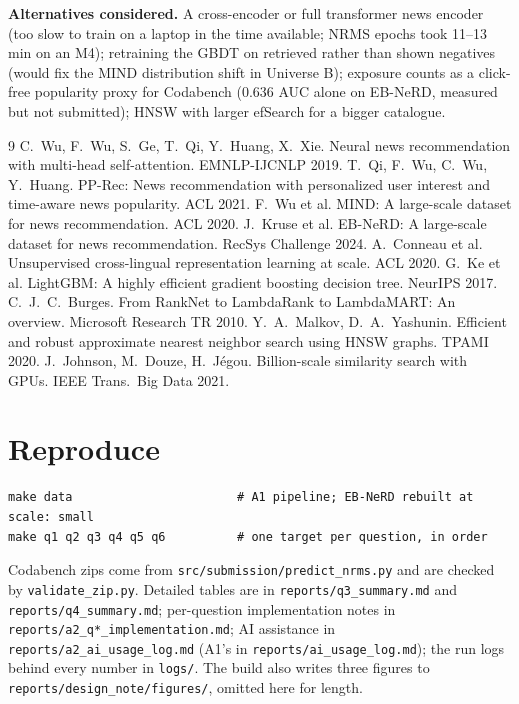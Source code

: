 \documentclass[10pt]{article}
\begin{document}
\textbf{Alternatives considered.} A cross-encoder or full transformer news encoder (too slow to train on a laptop in the
time available; NRMS epochs took 11--13 min on an M4); retraining the GBDT on retrieved rather than shown negatives
(would fix the MIND distribution shift in Universe B); exposure counts as a click-free popularity proxy for Codabench
(0.636 AUC alone on EB-NeRD, measured but not submitted); HNSW with larger efSearch for a bigger catalogue.
\begin{thebibliography}{9}\small\setlength{\itemsep}{0pt}
 C.~Wu, F.~Wu, S.~Ge, T.~Qi, Y.~Huang, X.~Xie. Neural news recommendation with multi-head self-attention. EMNLP-IJCNLP 2019.
 T.~Qi, F.~Wu, C.~Wu, Y.~Huang. PP-Rec: News recommendation with personalized user interest and time-aware news popularity. ACL 2021.
 F.~Wu et al. MIND: A large-scale dataset for news recommendation. ACL 2020.
 J.~Kruse et al. EB-NeRD: A large-scale dataset for news recommendation. RecSys Challenge 2024.
 A.~Conneau et al. Unsupervised cross-lingual representation learning at scale. ACL 2020.
 G.~Ke et al. LightGBM: A highly efficient gradient boosting decision tree. NeurIPS 2017.
 C.~J.~C.~Burges. From RankNet to LambdaRank to LambdaMART: An overview. Microsoft Research TR 2010.
 Y.~A.~Malkov, D.~A.~Yashunin. Efficient and robust approximate nearest neighbor search using HNSW graphs. TPAMI 2020.
 J.~Johnson, M.~Douze, H.~J\'egou. Billion-scale similarity search with GPUs. IEEE Trans.\ Big Data 2021.
\end{thebibliography}
\appendix
\section{Reproduce}
{\small\begin{verbatim}
make data                       # A1 pipeline; EB-NeRD rebuilt at scale: small
make q1 q2 q3 q4 q5 q6          # one target per question, in order
\end{verbatim}}
\vspace{-6pt}
Codabench zips come from \texttt{src/submission/predict\_nrms.py} and are checked by
\texttt{validate\_zip.py}. Detailed tables are in \texttt{reports/q3\_summary.md} and
\texttt{reports/q4\_summary.md}; per-question implementation notes in \texttt{reports/a2\_q*\_implementation.md};
AI assistance in \texttt{reports/a2\_ai\_usage\_log.md} (A1's in \texttt{reports/ai\_usage\_log.md}); the run logs
behind every number in \texttt{logs/}. The build also writes three figures to
\texttt{reports/design\_note/figures/}, omitted here for length.
\end{document}

